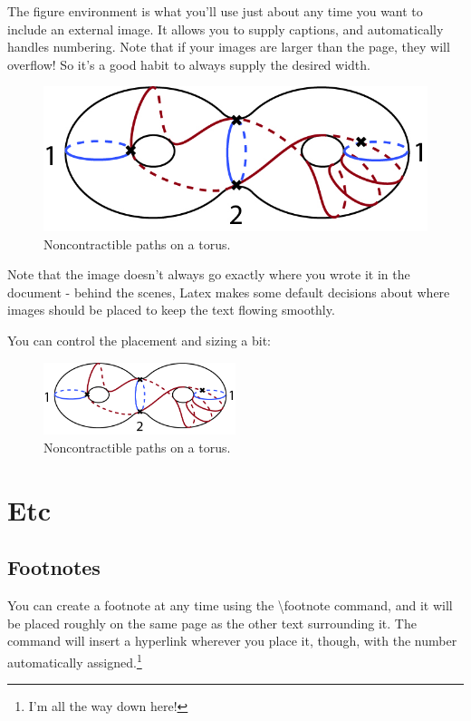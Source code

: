 \documentclass{article}
\begin{document}
The figure environment is what you'll use just about any time you want to include an external image. It allows you to supply captions, and automatically handles numbering. Note that if your images are larger than the page, they will overflow! So it's a good habit to always supply the desired width.

\begin{figure}
  \caption{Noncontractible paths on a torus.}
    \includegraphics[width=\textwidth]{ending-3} %
\end{figure}

Note that the image doesn't always go exactly where you wrote it in the document - behind the scenes, Latex makes some default decisions about where images should be placed to keep the text flowing smoothly.

You can control the placement and sizing a bit:
\begin{figure}[h] %
\centering
  \caption{Noncontractible paths on a torus.}
    \includegraphics[width=0.5\textwidth,keepaspectratio]{ending-3}
\end{figure}

\section{Etc}

\subsection{Footnotes}
You can create a footnote at any time using the \textbackslash footnote command, and it will be placed roughly on the same page as the other text surrounding it. The command will insert a hyperlink wherever you place it, though, with the number automatically assigned.\footnote{\label{myFootnoteName}I'm all the way down here!}
\end{document}
